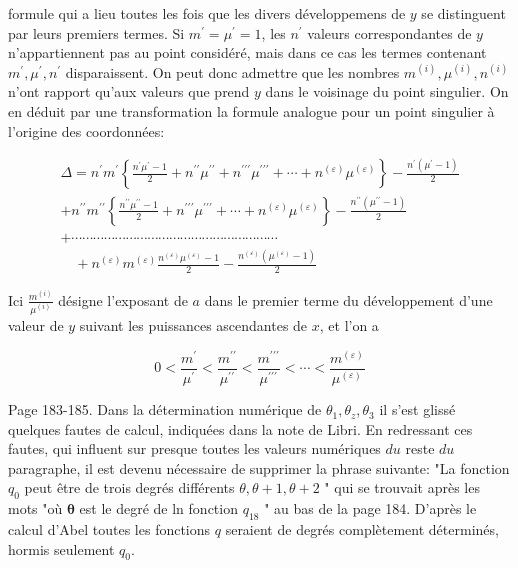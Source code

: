\documentclass{article}
\begin{document}

formule qui a lieu toutes les fois que les divers développemens de \(y\) se distinguent par leurs premiers termes. Si \(m^{\prime}=\mu^{\prime}=1\), les \(n^{\prime}\) valeurs correspondantes de \(y\) n'appartiennent pas au point considéré, mais dans ce cas les termes contenant \(m^{\prime}, \mu^{\prime}, n^{\prime}\) disparaissent. On peut donc admettre que les nombres \(m^{(i)}, \mu^{(i)}, n^{(i)}\) n'ont rapport qu'aux valeurs que prend \(y\) dans le voisinage du point singulier. On en déduit par une transformation la formule analogue pour un point singulier à l'origine des coordonnées:

\[
\begin{array}{r}
\Delta=n^{\prime} m^{\prime}\left\{\frac{n^{\prime} \mu^{\prime}-1}{2}+n^{\prime \prime} \mu^{\prime \prime}+n^{\prime \prime \prime} \mu^{\prime \prime \prime}+\cdots+n^{(\varepsilon)} \mu^{(\varepsilon)}\right\}-\frac{n^{\prime}\left(\mu^{\prime}-1\right)}{2} \\
+n^{\prime \prime} m^{\prime \prime}\left\{\frac{n^{\prime \prime} \mu^{\prime \prime}-1}{2}+n^{\prime \prime \prime} \mu^{\prime \prime \prime}+\cdots+n^{(\varepsilon)} \mu^{(\varepsilon)}\right\}-\frac{n^{\prime \prime}\left(\mu^{\prime \prime}-1\right)}{2} \\
+\cdots \cdots \cdots \cdots \cdots \cdots \cdots \cdots \cdots \cdots \cdots \cdots \cdots \cdots \cdots \cdots \cdots \cdots \cdots \\
\quad+n^{(\varepsilon)} m^{(\varepsilon)} \frac{n^{(\varepsilon)} \mu^{(\varepsilon)}-1}{2}-\frac{n^{(\varepsilon)}\left(\mu^{(\varepsilon)}-1\right)}{2}
\end{array}
\]

Ici \(\frac{m^{(i)}}{\mu^{(i)}}\) désigne l'exposant de \(a\) dans le premier terme du développement d'une valeur de \(y\) suivant les puissances ascendantes de \(x\), et l'on a

\[
0<\frac{m^{\prime}}{\mu^{\prime}}<\frac{m^{\prime \prime}}{\mu^{\prime \prime}}<\frac{m^{\prime \prime \prime}}{\mu^{\prime \prime \prime}}<\cdots<\frac{m^{(\varepsilon)}}{\mu^{(\varepsilon)}}
\]

Page 183-185. Dans la détermination numérique de \(\theta_{1}, \theta_{z}, \theta_{3}\) il s'est glissé quelques fautes de calcul, indiquées dans la note de Libri. En redressant ces fautes, qui influent sur presque toutes les valeurs numériques \(d u\) reste \(d u\) paragraphe, il est devenu nécessaire de supprimer la phrase suivante: "La fonction \(q_{0}\) peut être de trois degrés différents \(\theta, \theta+1, \theta+2\) " qui se trouvait après les mots "où \(\boldsymbol{\theta}\) est le degré de ln fonction \(q_{18}\) " au bas de la page 184. D'après le calcul d'Abel toutes les fonctions \(q\) seraient de degrés complètement déterminés, hormis seulement \(q_{0}\).
\end{document}
